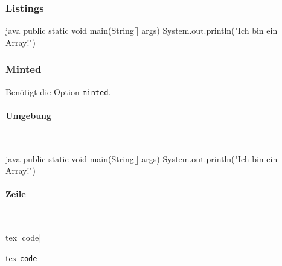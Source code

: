 \subsubsection{Listings}
\begin{listing}[H]
\begin{code}{java}
    public static void main(String[] args) {
        System.out.println("Ich bin ein Array!")
    }
\end{code}
\caption{Java Lstlisting}
\label{lst:java-lstlisting}
\end{listing}

\newpage
\subsubsection{Minted}
Benötigt die Option \texttt{minted}.
\paragraph{Umgebung}~\\
\begin{listing}[H]
\begin{code}[firstnumber=last]{java}
    public static void main(String[] args) {
        System.out.println("Ich bin ein Array!")
    }
\end{code}
\caption{Minted Umgebung}
\label{lst:minted-env}
\end{listing}

\paragraph{Zeile}~\\
\begin{listing}[H]
\begin{code}{tex}
|code|
\end{code}
\caption{Minted Einzeiler}
\label{lst:minted-line}
\end{listing}

\begin{listing}[H]
\begin{code}{tex}
\texttt{code}
\end{code}
\caption{Minted Inline}
\label{lst:minted-inline}
\end{listing}